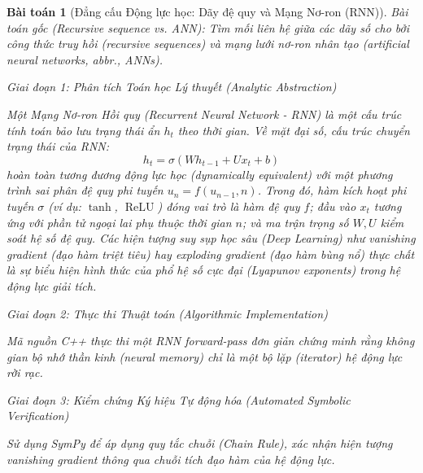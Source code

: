 \documentclass{article}
\newtheorem{baitoan}{Bài toán}
\begin{document}
\begin{baitoan}[Đẳng cấu Động lực học: Dãy đệ quy và Mạng Nơ-ron (RNN)]
 \emph{Bài toán gốc (Recursive sequence vs. ANN):} 
 Tìm mối liên hệ giữa các dãy số cho bởi công thức truy hồi (recursive sequences) và mạng lưới nơ-ron nhân tạo (artificial neural networks, abbr., ANNs).

\vspace{0.5em}\noindent\emph{Giai đoạn 1: Phân tích Toán học Lý thuyết (Analytic Abstraction)}
 
 Một Mạng Nơ-ron Hồi quy (Recurrent Neural Network - RNN) là một cấu trúc tính toán bảo lưu trạng thái ẩn $h_t$ theo thời gian. Về mặt đại số, cấu trúc chuyển trạng thái của RNN:
 \begin{equation}
 h_t = \sigma(W h_{t-1} + U x_t + b)
 \end{equation}
 hoàn toàn tương đương động lực học (dynamically equivalent) với một phương trình sai phân đệ quy phi tuyến $u_n = f(u_{n-1}, n)$. Trong đó, hàm kích hoạt phi tuyến $\sigma$ (ví dụ: $\tanh$, $\operatorname{ReLU}$) đóng vai trò là hàm đệ quy $f$; đầu vào $x_t$ tương ứng với phần tử ngoại lai phụ thuộc thời gian $n$; và ma trận trọng số $W, U$ kiểm soát hệ số đệ quy. 
 Các hiện tượng suy sụp học sâu (Deep Learning) như vanishing gradient (đạo hàm triệt tiêu) hay exploding gradient (đạo hàm bùng nổ) thực chất là sự biểu hiện hình thức của phổ hệ số cực đại (Lyapunov exponents) trong hệ động lực giải tích.

\vspace{0.5em}\noindent\emph{Giai đoạn 2: Thực thi Thuật toán (Algorithmic Implementation)}
 
 Mã nguồn C++ thực thi một RNN forward-pass đơn giản chứng minh rằng không gian bộ nhớ thần kinh (neural memory) chỉ là một bộ lặp (iterator) hệ động lực rời rạc.



\vspace{0.5em}\noindent\emph{Giai đoạn 3: Kiểm chứng Ký hiệu Tự động hóa (Automated Symbolic Verification)}
 
 Sử dụng \textsf{SymPy} để áp dụng quy tắc chuỗi (Chain Rule), xác nhận hiện tượng vanishing gradient thông qua chuỗi tích đạo hàm của hệ động lực.




\end{baitoan}
\end{document}
